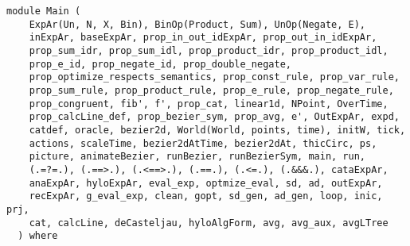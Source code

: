 \label{module:Main}
\haddockbeginheader
{\haddockverb\begin{verbatim}
module Main (
    ExpAr(Un, N, X, Bin), BinOp(Product, Sum), UnOp(Negate, E),
    inExpAr, baseExpAr, prop_in_out_idExpAr, prop_out_in_idExpAr,
    prop_sum_idr, prop_sum_idl, prop_product_idr, prop_product_idl,
    prop_e_id, prop_negate_id, prop_double_negate,
    prop_optimize_respects_semantics, prop_const_rule, prop_var_rule,
    prop_sum_rule, prop_product_rule, prop_e_rule, prop_negate_rule,
    prop_congruent, fib', f', prop_cat, linear1d, NPoint, OverTime,
    prop_calcLine_def, prop_bezier_sym, prop_avg, e', OutExpAr, expd,
    catdef, oracle, bezier2d, World(World, points, time), initW, tick,
    actions, scaleTime, bezier2dAtTime, bezier2dAt, thicCirc, ps,
    picture, animateBezier, runBezier, runBezierSym, main, run,
    (.=?=.), (.==>.), (.<==>.), (.==.), (.<=.), (.&&&.), cataExpAr,
    anaExpAr, hyloExpAr, eval_exp, optmize_eval, sd, ad, outExpAr,
    recExpAr, g_eval_exp, clean, gopt, sd_gen, ad_gen, loop, inic, prj,
    cat, calcLine, deCasteljau, hyloAlgForm, avg, avg_aux, avgLTree
  ) where\end{verbatim}}
\haddockendheader

